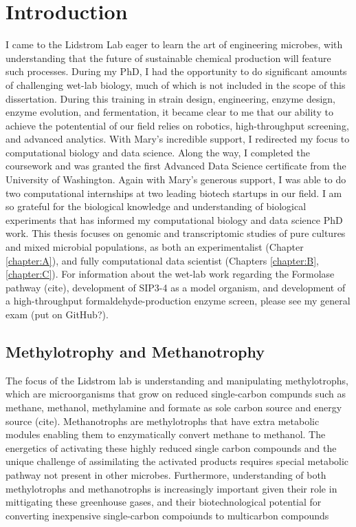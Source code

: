\chapter{Introduction}

I came to the Lidstrom Lab eager to learn the art of engineering microbes, with understanding that the future of sustainable chemical production will feature such processes.
During my PhD, I had the opportunity to do significant amounts of challenging wet-lab biology, much of which is not included in the scope of this dissertation.
During this training in strain design, engineering, enzyme design, enzyme evolution, and fermentation, it became clear to me that our ability to achieve the potentential of our field relies on robotics, high-throughput screening, and advanced analytics.
With Mary's incredible support, I redirected my focus to computational biology and data science.
Along the way, I completed the coursework and was granted the first Advanced Data Science certificate from the University of Washington.
Again with Mary's generous support, I was able to do two computational internships at two leading biotech startups in our field.
I am so grateful for the biological knowledge and understanding of biological experiments that has informed my computational biology and data science PhD work.
This thesis focuses on genomic and transcriptomic studies of pure cultures and mixed microbial populations, as both an experimentalist (Chapter \ref{chapter:A}), and fully computational data scientist (Chapters \ref{chapter:B}, \ref{chapter:C}).
For information about the wet-lab work regarding the Formolase pathway (cite), development of SIP3-4 as a model organism, and development of a high-throughput formaldehyde-production enzyme screen, please see my general exam (put on GitHub?).

\section{Methylotrophy and Methanotrophy}
The focus of the Lidstrom lab is understanding and manipulating methylotrophs, which are microorganisms that grow on reduced single-carbon compunds such as methane, methanol, methylamine and formate as sole carbon source and energy source (cite).
Methanotrophs are methylotrophs that have extra metabolic modules enabling them to enzymatically convert methane to methanol.
The energetics of activating these highly reduced single carbon compounds and the unique challenge of assimilating the activated products requires special metabolic pathway not present in other microbes.
Furthermore, understanding of both methylotrophs and methanotrophs is increasingly important given their role in mittigating these greenhouse gases, and their biotechnological potential for converting inexpensive single-carbon compoiunds to multicarbon compounds

